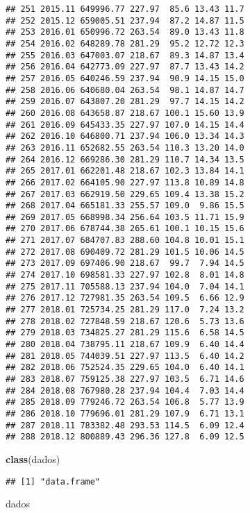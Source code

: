 \documentclass[]{article}
\newenvironment{Shaded}{\begin{snugshade}}{\end{snugshade}}
\newcommand{\KeywordTok}[1]{\textcolor[rgb]{0.13,0.29,0.53}{\textbf{#1}}}
\newcommand{\NormalTok}[1]{#1}
\begin{document}
\begin{verbatim}
## 251 2015.11 649996.77 227.97  85.6 13.43 11.7
## 252 2015.12 659005.51 237.94  87.2 14.87 11.5
## 253 2016.01 650996.72 263.54  89.0 13.43 11.8
## 254 2016.02 648289.78 281.29  95.2 12.72 12.3
## 255 2016.03 647003.07 218.67  89.3 14.87 13.4
## 256 2016.04 642773.09 227.97  87.7 13.43 14.2
## 257 2016.05 640246.59 237.94  90.9 14.15 15.0
## 258 2016.06 640680.04 263.54  98.1 14.87 14.7
## 259 2016.07 643807.20 281.29  97.7 14.15 14.2
## 260 2016.08 643658.87 218.67 100.1 15.60 13.9
## 261 2016.09 645433.35 227.97 107.0 14.15 14.4
## 262 2016.10 646800.71 237.94 106.0 13.34 14.3
## 263 2016.11 652682.55 263.54 110.3 13.20 14.0
## 264 2016.12 669286.30 281.29 110.7 14.34 13.5
## 265 2017.01 662201.48 218.67 102.3 13.84 14.1
## 266 2017.02 664105.90 227.97 113.8 10.89 14.8
## 267 2017.03 662919.50 229.65 109.4 13.38 15.2
## 268 2017.04 665181.33 255.57 109.0  9.86 15.5
## 269 2017.05 668998.34 256.64 103.5 11.71 15.9
## 270 2017.06 678744.38 265.61 100.1 10.15 15.6
## 271 2017.07 684707.83 288.60 104.8 10.01 15.1
## 272 2017.08 690409.72 281.29 101.5 10.06 14.5
## 273 2017.09 697406.90 218.67  99.7  7.94 14.5
## 274 2017.10 698581.33 227.97 102.8  8.01 14.8
## 275 2017.11 705588.13 237.94 104.0  7.04 14.1
## 276 2017.12 727981.35 263.54 109.5  6.66 12.9
## 277 2018.01 725734.25 281.29 117.0  7.24 13.2
## 278 2018.02 727848.59 218.67 120.6  5.73 13.6
## 279 2018.03 734825.27 281.29 115.6  6.58 14.5
## 280 2018.04 738795.11 218.67 109.9  6.40 14.4
## 281 2018.05 744039.51 227.97 113.5  6.40 14.2
## 282 2018.06 752524.35 229.65 104.0  6.40 14.1
## 283 2018.07 759125.38 227.97 103.5  6.71 14.6
## 284 2018.08 767980.28 237.94 104.4  7.03 14.4
## 285 2018.09 779246.72 263.54 106.8  5.77 13.9
## 286 2018.10 779696.01 281.29 107.9  6.71 13.1
## 287 2018.11 783382.48 293.53 114.5  6.09 12.4
## 288 2018.12 800889.43 296.36 127.8  6.09 12.5
\end{verbatim}

\begin{Shaded}
\begin{Highlighting}[]
\KeywordTok{class}\NormalTok{(dados)}
\end{Highlighting}
\end{Shaded}

\begin{verbatim}
## [1] "data.frame"
\end{verbatim}

\begin{Shaded}
\begin{Highlighting}[]
\NormalTok{dados}
\end{Highlighting}
\end{Shaded}
\end{document}
